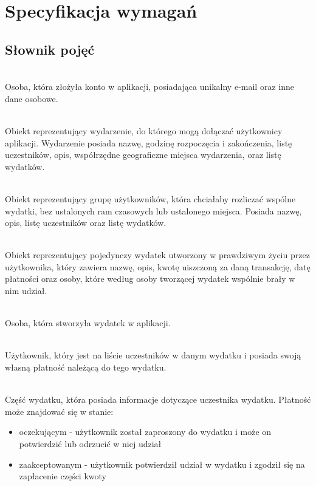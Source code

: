 \newpage %

\section{Specyfikacja wymagań}
\subsection{Słownik pojęć}
\begin{description}[leftmargin={15pt},labelindent={0pt}]
  \item[Użytkownik] \hfill \\ Osoba, która złożyła konto w aplikacji, posiadająca unikalny e-mail oraz inne dane osobowe.
  \item[Wydarzenie] \hfill \\ Obiekt reprezentujący wydarzenie, do którego mogą dołączać użytkownicy aplikacji. Wydarzenie posiada nazwę, godzinę rozpoczęcia i zakończenia, listę uczestników, opis, współrzędne geograficzne miejsca wydarzenia, oraz listę wydatków.
  \item[Grupa] \hfill \\ Obiekt reprezentujący grupę użytkowników, która chciałaby rozliczać wspólne wydatki, bez ustalonych ram czasowych lub ustalonego miejsca. Posiada nazwę, opis, listę uczestników oraz listę wydatków.
  \item[Wydatek] \hfill \\ Obiekt reprezentujący pojedynczy wydatek utworzony w prawdziwym życiu przez użytkownika, który zawiera nazwę, opis, kwotę uiszczoną za daną transakcję, datę płatności oraz osoby, które według osoby tworzącej wydatek wspólnie brały w nim udział.
  \item[Inicjator wydatku] \hfill \\ Osoba, która stworzyła wydatek w aplikacji.
  \item[Uczestnik wydatku] \hfill \\ Użytkownik, który jest na liście uczestników w danym wydatku i posiada swoją własną płatność należącą do tego wydatku.
  \item[Płatność] \hfill \\ Część wydatku, która posiada informacje dotyczące uczestnika wydatku. Płatność może znajdować się w stanie:
    \begin{itemize}
    \item oczekującym - użytkownik został zaproszony do wydatku i może on potwierdzić lub odrzucić w niej udział
    \item zaakceptowanym - użytkownik potwierdził udział w wydatku i zgodził się na zapłacenie części kwoty

\end{itemize}
\end{description}
